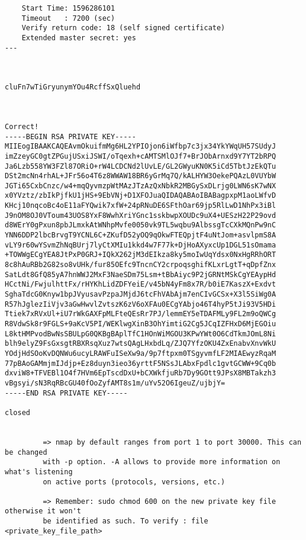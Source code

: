 \documentclass[a4paper]{report}
\begin{document}
\begin{verbatim}
    Start Time: 1596286101
    Timeout   : 7200 (sec)
    Verify return code: 18 (self signed certificate)
    Extended master secret: yes
---



cluFn7wTiGryunymYOu4RcffSxQluehd



Correct!
-----BEGIN RSA PRIVATE KEY-----
MIIEogIBAAKCAQEAvmOkuifmMg6HL2YPIOjon6iWfbp7c3jx34YkYWqUH57SUdyJ
imZzeyGC0gtZPGujUSxiJSWI/oTqexh+cAMTSMlOJf7+BrJObArnxd9Y7YT2bRPQ
Ja6Lzb558YW3FZl87ORiO+rW4LCDCNd2lUvLE/GL2GWyuKN0K5iCd5TbtJzEkQTu
DSt2mcNn4rhAL+JFr56o4T6z8WWAW18BR6yGrMq7Q/kALHYW3OekePQAzL0VUYbW
JGTi65CxbCnzc/w4+mqQyvmzpWtMAzJTzAzQxNbkR2MBGySxDLrjg0LWN6sK7wNX
x0YVztz/zbIkPjfkU1jHS+9EbVNj+D1XFOJuaQIDAQABAoIBABagpxpM1aoLWfvD
KHcj10nqcoBc4oE11aFYQwik7xfW+24pRNuDE6SFthOar69jp5RlLwD1NhPx3iBl
J9nOM8OJ0VToum43UOS8YxF8WwhXriYGnc1sskbwpXOUDc9uX4+UESzH22P29ovd
d8WErY0gPxun8pbJLmxkAtWNhpMvfe0050vk9TL5wqbu9AlbssgTcCXkMQnPw9nC
YNN6DDP2lbcBrvgT9YCNL6C+ZKufD52yOQ9qOkwFTEQpjtF4uNtJom+asvlpmS8A
vLY9r60wYSvmZhNqBUrj7lyCtXMIu1kkd4w7F77k+DjHoAXyxcUp1DGL51sOmama
+TOWWgECgYEA8JtPxP0GRJ+IQkX262jM3dEIkza8ky5moIwUqYdsx0NxHgRRhORT
8c8hAuRBb2G82so8vUHk/fur85OEfc9TncnCY2crpoqsghifKLxrLgtT+qDpfZnx
SatLdt8GfQ85yA7hnWWJ2MxF3NaeSDm75Lsm+tBbAiyc9P2jGRNtMSkCgYEAypHd
HCctNi/FwjulhttFx/rHYKhLidZDFYeiE/v45bN4yFm8x7R/b0iE7KaszX+Exdvt
SghaTdcG0Knyw1bpJVyusavPzpaJMjdJ6tcFhVAbAjm7enCIvGCSx+X3l5SiWg0A
R57hJglezIiVjv3aGwHwvlZvtszK6zV6oXFAu0ECgYAbjo46T4hyP5tJi93V5HDi
Ttiek7xRVxUl+iU7rWkGAXFpMLFteQEsRr7PJ/lemmEY5eTDAFMLy9FL2m9oQWCg
R8VdwSk8r9FGLS+9aKcV5PI/WEKlwgXinB3OhYimtiG2Cg5JCqIZFHxD6MjEGOiu
L8ktHMPvodBwNsSBULpG0QKBgBAplTfC1HOnWiMGOU3KPwYWt0O6CdTkmJOmL8Ni
blh9elyZ9FsGxsgtRBXRsqXuz7wtsQAgLHxbdLq/ZJQ7YfzOKU4ZxEnabvXnvWkU
YOdjHdSOoKvDQNWu6ucyLRAWFuISeXw9a/9p7ftpxm0TSgyvmfLF2MIAEwyzRqaM
77pBAoGAMmjmIJdjp+Ez8duyn3ieo36yrttF5NSsJLAbxFpdlc1gvtGCWW+9Cq0b
dxviW8+TFVEBl1O4f7HVm6EpTscdDxU+bCXWkfjuRb7Dy9GOtt9JPsX8MBTakzh3
vBgsyi/sN3RqRBcGU40fOoZyfAMT8s1m/uYv52O6IgeuZ/ujbjY=
-----END RSA PRIVATE KEY-----

closed


		 => nmap by default ranges from port 1 to port 30000. This can be changed 
		 with -p option. -A allows to provide more information on what's listening 
		 on active ports (protocols, versions, etc.)
		 
		 => Remember: sudo chmod 600 on the new private key file otherwise it won't 
		 be identified as such. To verify : file <private_key_file_path>
\end{verbatim}
\end{document}

